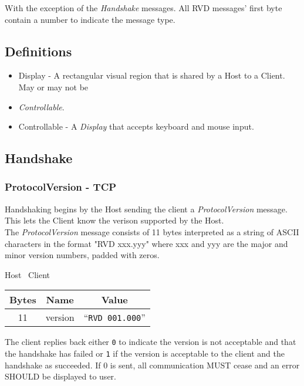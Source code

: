 \documentclass{article}
\begin{document}
    With the exception of the \emph{Handshake} messages. All RVD messages' first byte contain a number to indicate
    the message type.

    \subsection{Definitions}

    \begin{itemize}
        \item Display - A rectangular visual region that is shared by a Host to a Client. May or may not be
        \item \emph{Controllable}.
        \item Controllable - A \emph{Display} that accepts keyboard and mouse input.
    \end{itemize}

    \subsection{Handshake}

    \subsubsection{ProtocolVersion - TCP}
    Handshaking begins by the Host sending the client a \emph{ProtocolVersion} message. This lets the Client know the
    verison supported by the Host.\\

    The \emph{ProtocolVersion} message consists of 11 bytes interpreted as a string of ASCII characters in the format
    "RVD xxx.yyy" where xxx and yyy are the major and minor version numbers, padded with zeros.

    \begin{center}
        Host \textrightarrow\ Client\\
        \begin{tabular}{|c|c|c|}
            \hline
            \textbf{Bytes} & \textbf{Name} & \textbf{Value}           \\
            \hline
            11             & version       & ``\texttt{RVD 001.000}'' \\
            \hline
        \end{tabular}
    \end{center}

    The client replies back either \texttt{0} to indicate the version is not acceptable and that the handshake has
    failed or \texttt{1} if the version is acceptable to the client and the handshake as succeeded. If 0 is sent, all
    communication MUST cease and an error SHOULD be displayed to user.
\end{document}
